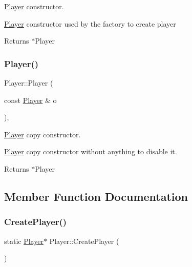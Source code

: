 \hyperlink{class_player}{Player} constructor. 

\hyperlink{class_player}{Player} constructor used by the factory to create player

\begin{DoxyReturn}{Returns}
$\ast$\+Player 
\end{DoxyReturn}
\mbox{\label{class_player_a608b5f4723b8a2a159f53bdcedfa0fda}} 
\subsubsection{\texorpdfstring{Player()}{Player()}\hspace{0.1cm}{\footnotesize\ttfamily [2/2]}}
{\footnotesize\ttfamily Player\+::\+Player (\begin{DoxyParamCaption}\item[{const \hyperlink{class_player}{Player} \&}]{o }\end{DoxyParamCaption})\hspace{0.3cm}{\ttfamily [inline]}, {\ttfamily [protected]}}



\hyperlink{class_player}{Player} copy constructor. 

\hyperlink{class_player}{Player} copy constructor without anything to disable it.

\begin{DoxyReturn}{Returns}
$\ast$\+Player 
\end{DoxyReturn}


\subsection{Member Function Documentation}
\mbox{\label{class_player_ad2426f529ae2cfb0d8fb3cecbe2593b4}} 
\subsubsection{\texorpdfstring{Create\+Player()}{CreatePlayer()}}
{\footnotesize\ttfamily static \hyperlink{class_player}{Player}$\ast$ Player\+::\+Create\+Player (\begin{DoxyParamCaption}{ }\end{DoxyParamCaption})\hspace{0.3cm}{\ttfamily [static]}}



